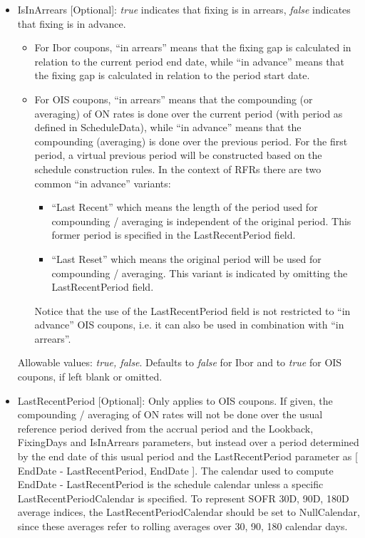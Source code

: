 \begin{itemize}
\item IsInArrears [Optional]: \emph{true} indicates that fixing is in arrears, \emph{false} indicates that fixing is in advance.
  \begin{itemize}
  \item For Ibor coupons, ``in arrears'' means that the fixing gap is calculated in relation to the current period end
    date, while ``in advance'' means that the fixing gap is calculated in relation to the period start date.
  \item For OIS coupons, ``in arrears'' means that the compounding (or averaging) of ON rates is done over the current
    period (with period as defined in ScheduleData), while ``in advance'' means that the compounding (averaging) is done over the previous period. For the first
    period, a virtual previous period will be constructed based on the schedule construction rules. In the context of
    RFRs there are two common ``in advance'' variants:
    \begin{itemize}
    \item``Last Recent'' which means the length of the period used for compounding / averaging is independent of the
      original period. This former period is specified in the LastRecentPeriod field.
    \item ``Last Reset'' which means the original period will be used for compounding / averaging. This variant is
      indicated by omitting the LastRecentPeriod field.
    \end{itemize}
    Notice that the use of the LastRecentPeriod field is not restricted to ``in advance'' OIS coupons, i.e. it can also
    be used in combination with ``in arrears''.
  \end{itemize}

  Allowable values: \emph{true, false}. Defaults to \emph{false} for Ibor and to \emph{true} for OIS coupons, if left
  blank or omitted.

\item LastRecentPeriod [Optional]: Only applies to OIS coupons. If given, the compounding / averaging of ON rates will
  not be done over the usual reference period derived from the accrual period and the Lookback, FixingDays and
  IsInArrears parameters, but instead over a period determined by the end date of this usual period and the
  LastRecentPeriod parameter as [ EndDate - LastRecentPeriod, EndDate ]. The calendar used to compute EndDate -
  LastRecentPeriod is the schedule calendar unless a specific LastRecentPeriodCalendar is specified. To represent SOFR
  30D, 90D, 180D average indices, the LastRecentPeriodCalendar should be set to NullCalendar, since these averages refer
  to rolling averages over 30, 90, 180 calendar days. \\


\end{itemize}
